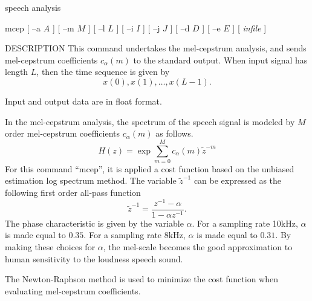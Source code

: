 %
{speech analysis}

\begin{synopsis}
\item [mcep] [ --a $A$ ] [ --m $M$ ] [ --l $L$ ] [ --i $I$ ] [ --j $J$ ] 
	     [ --d $D$ ] [ --e $E$ ] [ {\em infile} ]
\end{synopsis}

\begin{qsection}{DESCRIPTION}
This command undertakes the mel-cepstrum analysis,
and sends mel-cepstrum coefficients $c_{\alpha}(m)$ 
to the standard output.
When input signal has length $L$,
then the time sequence is given by
\begin{displaymath}
  x(0),x(1),\ldots,x(L-1).
\end{displaymath}
\par
Input and output data are in float format.
\par
In the mel-cepstrum analysis, the spectrum of the speech signal
is modeled by $M$ order mel-cepstrum coefficients $c_{\alpha}(m)$
as follows.
\begin{displaymath}
H(z) = \exp \sum_{m=0}^M c_{\alpha}(m) \tilde{z}^{-m} 
\end{displaymath}
For this command ``mcep'', it is applied a cost function
based on the unbiased estimation log spectrum method.
The variable $\tilde{z}^{-1}$ can be expressed as the following
first order all-pass function
\begin{displaymath}
\tilde{z}^{-1} = \frac{z^{-1}-\alpha}{1-\alpha z^{-1}}.
\end{displaymath}
The phase characteristic is given by the variable $\alpha$.
For a sampling rate 10kHz, $\alpha$ is made equal to $0.35$.
For a sampling rate 8kHz, $\alpha$ is made equal to $0.31$.
By making these choices for $\alpha$,
the mel-scale becomes the good approximation to human
sensitivity to the loudness speech sound.
\par
The Newton-Raphson method is used to minimize the cost function
when evaluating mel-cepstrum coefficients.
\end{qsection}

\begin{options}
\end{options}

